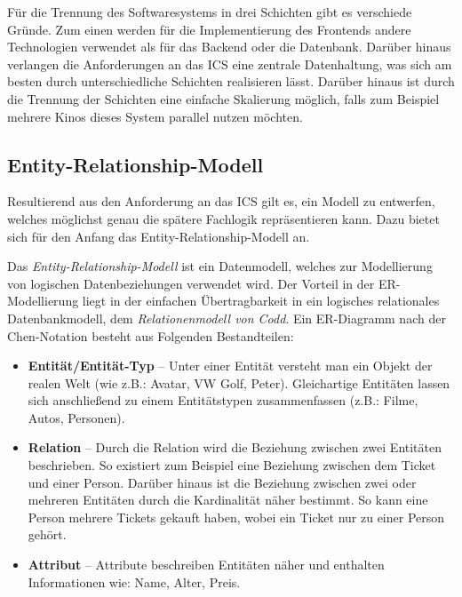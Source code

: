 		Für die Trennung des Softwaresystems in drei Schichten gibt es verschiede Gründe. Zum einen werden für die Implementierung des Frontends andere Technologien verwendet als für das Backend oder die Datenbank. Darüber hinaus verlangen die Anforderungen an das \ac{ICS} eine zentrale Datenhaltung, was sich am besten durch unterschiedliche Schichten realisieren lässt. Darüber hinaus ist durch die Trennung der Schichten eine einfache Skalierung möglich, falls zum Beispiel mehrere Kinos dieses System parallel nutzen möchten.
		\subsection{Entity-Relationship-Modell}\label{chapter:er-diagramm}
		Resultierend aus den Anforderung an das \ac{ICS} gilt es, ein Modell zu entwerfen, welches möglichst genau die spätere Fachlogik repräsentieren kann. Dazu bietet sich für den Anfang das \glqq Entity-Relationship-Modell\grqq{} an.
			
		Das \textit{\glqq Entity-Relationship-Modell\grqq{}} ist ein Datenmodell, welches zur Modellierung von logischen Datenbeziehungen verwendet wird. Der Vorteil in der ER-Modellierung liegt in der einfachen Übertragbarkeit in ein logisches relationales Datenbankmodell, dem \textit{Relationenmodell von Codd}. Ein ER-Diagramm nach der Chen-Notation besteht aus Folgenden Bestandteilen:\autocite[Vgl.][]{Stobitzer.0130201914:40Uhr}
			\begin{itemize}
				\item \textbf{Entität/Entität-Typ} -- Unter einer Entität versteht man ein Objekt der realen Welt (wie z.B.: Avatar, VW Golf, Peter). Gleichartige Entitäten lassen sich anschließend zu einem Entitätstypen zusammenfassen (z.B.: Filme, Autos, Personen).\autocite[Vgl.][]{Stobitzer.0130201914:40Uhr} 
				\item \textbf{Relation} -- Durch die Relation wird die Beziehung zwischen zwei Entitäten beschrieben. So existiert zum Beispiel eine Beziehung zwischen dem Ticket und einer Person. Darüber hinaus ist die Beziehung zwischen zwei oder mehreren Entitäten durch die Kardinalität näher bestimmt. So kann eine Person mehrere Tickets gekauft haben, wobei ein Ticket nur zu einer Person gehört.\autocite[Vgl.][]{Stobitzer.0130201914:40Uhr}
				\item \textbf{Attribut} -- Attribute beschreiben Entitäten näher und enthalten Informationen wie: Name, Alter, Preis.
			\end{itemize}
		
